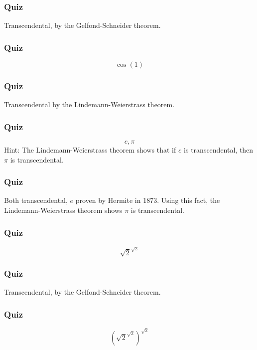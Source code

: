 \documentclass{beamer}
\begin{document}
    \begin{frame}
        \frametitle{Quiz}
        \begin{center}
            Transcendental, by the Gelfond-Schneider theorem.
        \end{center}
    \end{frame}
    \begin{frame}
        \frametitle{Quiz}
        \begin{center} 
            \[\cos(1)\]    
        \end{center}
    \end{frame}
    \begin{frame}
        \frametitle{Quiz}
        \begin{center}
            Transcendental by the Lindemann-Weierstrass theorem.
        \end{center}
    \end{frame}

    \begin{frame}
        \frametitle{Quiz}
        \begin{center} 
            \[ e, \pi \]
            Hint: The Lindemann-Weierstrass theorem shows that if $e$ is transcendental, then $\pi$ is transcendental.
        \end{center}
    \end{frame}
    \begin{frame}
        \frametitle{Quiz}
        \begin{center}
            Both transcendental, $e$ proven by Hermite in 1873. Using this fact, the Lindemann-Weierstrass theorem shows $\pi$ is transcendental.
        \end{center}
    \end{frame}
    \begin{frame}
        \frametitle{Quiz}
        \begin{center} 
            \[ \sqrt{2}^{\sqrt{2}} \]
        \end{center}
    \end{frame}

    \begin{frame}
        \frametitle{Quiz}
        \begin{center}
            Transcendental, by the Gelfond-Schneider theorem.
        \end{center}
    \end{frame}

    \begin{frame}
        \frametitle{Quiz}
        \begin{center} 
            \[ {\left(\sqrt{2}^{\sqrt{2}}\right)}^{\sqrt{2}} \]
        \end{center}
    \end{frame}
\end{document}
